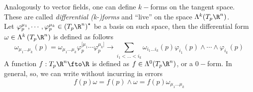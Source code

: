 \documentclass[../mmf.tex]{subfiles}
\begin{document}
\begin{dfn}
	Analogously to vector fields, one can define $k-$forms on the tangent space. These are called \textit{differential (k-)forms} and ``live'' on the space $\Lambda^k(T_p\R^n)$.\\
	Let $\varphi^{\mu_1}_p,\cdots,\varphi^{\mu_k}_p\in\left(T_p\R^n\right)^{\star}$ be a basis on such space, then the differential form $\omega\in\Lambda^k\left( T_p\R^n \right)$ is defined as follows
	\begin{equation}
		\omega_{\mu_1\ldots\mu_k}(p)=\omega_{\mu_1\ldots\mu_k}\varphi^{[\mu_1}_p\cdots\varphi^{\mu_k]}_p\to\sum_{i_1<\ldots<i_k}\omega_{i_1\ldots i_k}(p)\varphi_{i_1}(p)\wedge\cdots\wedge\varphi_{i_k}(p)
		\label{eq:differentialformdef}
	\end{equation}
	A function $f:T_p\R^n\fto\R$ is defined as $f\in\Lambda^0(T_p\R^n)$, or a $0-$form. In general, so, we can write without incurring in errors
	\begin{equation}
		f(p)\omega=f(p)\wedge\omega=f(p)\omega_{\mu_1\ldots\mu_k}
		\label{eq:funcdifform}
	\end{equation}
\end{dfn}
\end{document}
